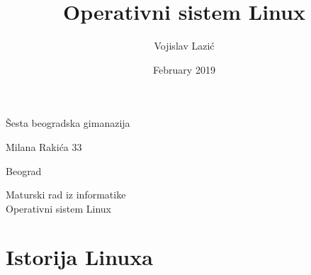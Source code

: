 \documentclass[12pt,oneside,a4paper]{article}
\title{Operativni sistem Linux}
\author{Vojislav Lazić}
\date{February 2019}
\begin{document}
\noindent\hspace{0in}Šesta beogradska gimanazija\par
\noindent\hspace{0in}Milana Rakića 33\par
\noindent\hspace{0in}Beograd\par
\begin{center}
Maturski rad iz informatike\\
Operativni sistem Linux
\end{center}
\thispagestyle{empty}


\newpage
\tableofcontents
\newpage
\section{Istorija Linuxa}




\end{document}
